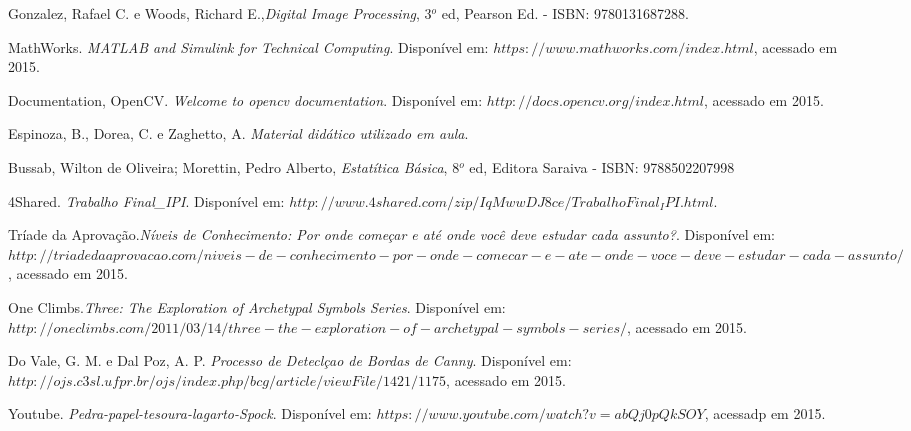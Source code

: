 \documentclass[conference]{Trabalho_Final}
\begin{document}
\begin{thebibliography}{1}

Gonzalez, Rafael C. e Woods, Richard E.,\emph{Digital Image Processing}, 3$^o$ ed,
Pearson Ed. - ISBN: 9780131687288. 

MathWorks. \emph{MATLAB and Simulink for Technical Computing}. Dispon\'ivel em: $https://www.mathworks.com/index.html$, acessado em 2015.

Documentation, OpenCV. \emph{Welcome to opencv documentation}. Dispon\'ivel em: $http://docs.opencv.org/index.html$, acessado em 2015.

Espinoza, B., Dorea, C. e Zaghetto, A. \emph{Material did\'atico utilizado em aula}.

Bussab, Wilton de Oliveira; Morettin, Pedro Alberto, \emph{Estat\'itica B\'asica}, 8$^o$ ed,
Editora Saraiva - ISBN: 9788502207998

4Shared. \emph{Trabalho Final\_IPI}. Dispon\'ivel em:
$http://www.4shared.com/zip/IqMwwDJ8ce/TrabalhoFinal_IPI.html$.

Tr\'iade da Aprova\c{c}\~ao.\emph{N\'iveis de Conhecimento: Por onde come\c{c}ar e at\'e onde voc\^e deve estudar cada assunto?}. Dispon\'ivel em:
$http://triadedaaprovacao.com/niveis-de-conhecimento-por-onde-comecar-e-ate-onde-voce-deve-estudar-cada-assunto/$, acessado em 2015.

One Climbs.\emph{Three: The Exploration of Archetypal Symbols Series}. Dispon\'ivel em:
$http://oneclimbs.com/2011/03/14/three-the-exploration-of-archetypal-symbols-series/$, acessado em 2015.

Do Vale, G. M. e Dal Poz, A. P. \emph{Processo de Detecl\c{c}ao de Bordas de Canny}. Dispon\'ivel em: $http://ojs.c3sl.ufpr.br/ojs/index.php/bcg/article/viewFile/1421/1175$, acessado em 2015.

Youtube. \emph{Pedra-papel-tesoura-lagarto-Spock}. Dispon\'ivel em: $https://www.youtube.com/watch?v=abQj0pQkSOY$, acessadp em 2015.

\end{thebibliography}

\end{document}
